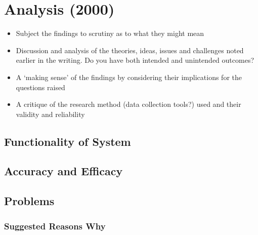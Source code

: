 \chapter{Analysis (2000)}
\begin{itemize}
	\item Subject the findings to scrutiny as to what they might mean
	\item Discussion and analysis of the theories, ideas, issues and challenges noted earlier in the writing. Do you have both intended and unintended outcomes?
	\item A `making sense' of the findings by considering their implications for the questions raised
	\item A critique of the research method (data collection tools?) used and their validity and reliability
\end{itemize}
\section{Functionality of System}
\section{Accuracy and Efficacy}
\section{Problems}
\subsection{Suggested Reasons Why}
